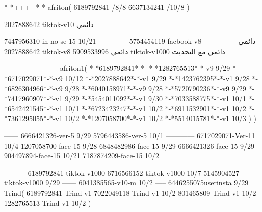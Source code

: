 *-*++++*-*
afriton(
6189792841 /8/8
6637134241 /10/8
)

2027888642 tiktok-v10
دائمي


7447956310-in-no-se-15 10/21
------------
5754454119 facbook-v8
دائمي
--------------
2027888642 tiktok-v8
دائمي
5909533996 tiktok-v1000
دائمي مع التحديث

__________
afriton1(
*-*6189792841*-*-
*-*1282765513*-*-v9 9/29
*-*6717029071*-*-v9 10/12
*-*2027888642*-*-v1 9/29
*-*1423762395*-*-v1 9/28
*-*6826304966*-*-v9 9/28
*-*6040158971*-*-v9 9/28
*-*5720790236*-*-v9 9/29
*-*7417960907*-*-v1 9/29
*-*5454011092*-*-v1 9/30
*-*7033588775*-*-v1 10/1
*-*6542421545*-*-v1 10/1
*-*6723423247*-*-v1 10/2
*-*6911532901*-*-v1 10/2
*-*7361295055*-*-v1 10/2
*-*1207058700*-*-v1 10/2
*-*5514015781*-*-v1 10/3
)
)

------
6666421326-ver-5 9/29
5796443586-ver-5 10/1
------------
6717029071-Ver-11
10/4
1207058700-face-15 9/28
6848482986-face-15 9/29
6666421326-face-15 9/29
904497894-face-15 10/21
7187874209-face-15 10/2

---------
6189792841 tiktok-v1000
6716566152 tiktok-v1000
10/7
5145904527 tiktok-v1000
9/29
------
6041385565-v10-m 10/2
-----
6446255075userinsta 9/29
Trind(
6189792841-Trind-v1 
7022049118-Trind-v1 10/2
801465809-Trind-v1 10/2
1282765513-Trind-v1 10/2
)
